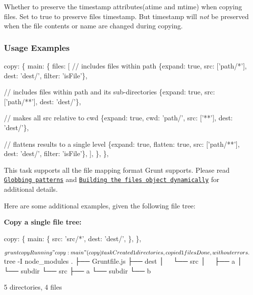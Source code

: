 Whether to preserve the timestamp attributes({\ttfamily atime} and {\ttfamily mtime}) when copying files. Set to {\ttfamily true} to preserve files timestamp. But timestamp will {\itshape not} be preserved when the file contents or name are changed during copying.

\subsubsection*{Usage Examples}


\begin{DoxyCode}
copy: \{
  main: \{
    files: [
      // includes files within path
      \{expand: true, src: ['path/*'], dest: 'dest/', filter: 'isFile'\},

      // includes files within path and its sub-directories
      \{expand: true, src: ['path/**'], dest: 'dest/'\},

      // makes all src relative to cwd
      \{expand: true, cwd: 'path/', src: ['**'], dest: 'dest/'\},

      // flattens results to a single level
      \{expand: true, flatten: true, src: ['path/**'], dest: 'dest/', filter: 'isFile'\},
    ],
  \},
\},
\end{DoxyCode}


This task supports all the file mapping format Grunt supports. Please read \href{http://gruntjs.com/configuring-tasks#globbing-patterns}{\tt Globbing patterns} and \href{http://gruntjs.com/configuring-tasks#building-the-files-object-dynamically}{\tt Building the files object dynamically} for additional details.

Here are some additional examples, given the following file tree\+: 


{\bfseries Copy a single file tree\+:} 
\begin{DoxyCode}
copy: \{
  main: \{
    src: 'src/*',
    dest: 'dest/',
  \},
\},
\end{DoxyCode}



\begin{DoxyCode}
$ grunt copy
Running "copy:main" (copy) task
Created 1 directories, copied 1 files

Done, without errors.
$ tree -I node\_modules
.
├── Gruntfile.js
├── dest
│   └── src
│       ├── a
│       └── subdir
└── src
    ├── a
    └── subdir
        └── b

5 directories, 4 files
\end{DoxyCode}


